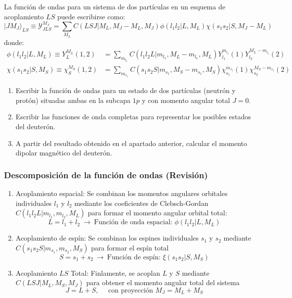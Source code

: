 \newpage
\begin{problema}
La función de ondas para un sistema de dos partículas en un esquema de acoplamiento $LS$ puede escribirse como:
\begin{equation}
|J M_J\rangle_{LS} \equiv \mathcal{Y}_{J L S}^{M_J} = \sum_{M_L} C(L S J | M_L, M_J - M_L, M_J) \phi(l_1 l_2 | L, M_L) \chi(s_1 s_2 | S, M_J - M_L)
\end{equation}
donde:
\begin{align}
\phi(l_1 l_2 | L, M_L) \equiv Y_L^{M_L}(1,2) &= \sum_{m_{l_1}} C(l_1 l_2 L | m_{l_1}, M_L - m_{l_1}, M_L) Y_{l_1}^{m_{l_1}}(1) Y_{l_2}^{M_L - m_{l_1}}(2) \\
\chi(s_1 s_2 | S, M_S) \equiv \chi_S^{M_S}(1,2) &= \sum_{m_{s_1}} C(s_1 s_2 S | m_{s_1}, M_S - m_{s_1}, M_S) \chi_{s_1}^{m_{s_1}}(1) \chi_{s_2}^{M_S - m_{s_1}}(2)
\end{align}

\begin{enumerate}[label=\alph*)]
    \item Escribir la función de ondas para un estado de dos partículas (neutrón y protón) situadas ambas en la subcapa $1p$ y con momento angular total $J = 0$.
    \item Escribir las funciones de onda completas para representar los posibles estados del deuterón.
    \item A partir del resultado obtenido en el apartado anterior, calcular el momento dipolar magnético del deuterón.
\end{enumerate}

\tcblower

\subsubsection*{Descomposición de la función de ondas (Revisión)}
\begin{enumerate}
    \item Acoplamiento espacial: Se combinan los momentos angulares orbitales individuales $l_1$ y $l_2$ mediante los coeficientes de Clebsch-Gordan $C(l_1l_2L|m_{l_1},m_{l_2},M_L)$ para formar el momento angular orbital total:
    \[
    L=l_1+l_2\:\to\:\text{Función de onda espacial: }\phi(l_1l_2|L,M_L)
    \]
    \item Acoplamiento de espín: Se combinan los espines individuales $s_1$ y $s_2$ mediante $C(s_1s_2S|m_{s_1},m_{s_2},M_S)$ para formar el espín total
    \[
    S=s_1+s_2\:\to\:\text{Función de espín: }\xi(s_1s_2|S,M_S)
    \]
    \item Acoplamiento $LS$ Total: Finlamente, se acoplan $L$ y $S$ mediante $C(LSJ|M_L,M_S,M_J)$ para obtener el momento angular total del sistema
    \[
    J=L+S,\quad\text{ con proyección }M_J=M_L+M_S
    \]
\end{enumerate}


\end{problema}
